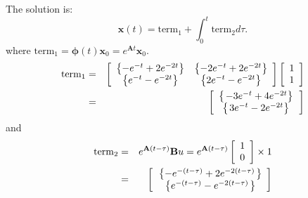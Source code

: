 The solution is:
\[
\mathbf{x}(t) = \mathrm{term}_1+\int_0^t\mathrm{term}_2 d\tau.
\]
where $\mathrm{term}_1=\mathbf{\phi}(t)\mathbf{x}_0=e^{\mathbf{A}t}\mathbf{x}_0$.
\begin{eqnarray*}
\mathrm{term}_1 & = & \left[ {\begin{array}{*{20}c}
	   \left\{ {-e^{ - t} + 2e^{-2t}} \right\} & \left\{ {-2e^{ - t} + 2e^{-2t}} \right\}  \\
	   \left\{ {e^{ - t} - e^{-2t}} \right\} & \left\{ {2e^{ - t} - e^{-2t}} \right\}  \\
	\end{array}} \right] \left[ {\begin{array}{*{20}c}
	   1  \\
	   1  \\
	\end{array}} \right] \\
	& = & \left[ {\begin{array}{*{20}c}
	   {\left\{ {\left. { - 3e^{ - t}  + 4e^{ - 2t} } \right\}} \right.}  \\
	   {\left\{ {\left. {3e^{ - t}  - 2e^{ - 2t} } \right\}} \right.}  \\
	\end{array}} \right]
\end{eqnarray*}
and
\begin{eqnarray*}
	{\rm{term}}_2  & = & e^{{\bf{A}}(t - \tau )} {\bf{B}}u = e^{{\bf{A}}(t - \tau )} \left[ {\begin{array}{*{20}c}
	   1  \\
	   0  \\
	\end{array}} \right] \times 1 \\
 & = & \left[ {\begin{array}{*{20}c}
   {\left. {\left\{ { - e^{ - (t - \tau )}  + 2e^{ - 2(t - \tau )} } \right.} \right\}}  \\
   {\left. {\left\{ {e^{ - (t - \tau )}  - e^{ - 2(t - \tau )} } \right.} \right\}}  \\
\end{array}} \right]
\end{eqnarray*}

